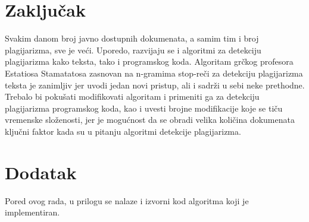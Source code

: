 \documentclass[a4paper]{article}
\begin{document}
\section{Zaključak}
\label{sec:zakljucak}

Svakim danom broj javno dostupnih dokumenata, a samim tim i broj plagijarizma, sve je veći. Uporedo, razvijaju se i algoritmi za detekciju plagijarizma kako teksta, tako i programskog koda. Algoritam grčkog profesora Estatiosa Stamatatosa zasnovan na n-gramima stop-reči za detekciju plagijarizma teksta je zanimljiv jer uvodi jedan novi pristup, ali i sadrži u sebi neke prethodne. Trebalo bi pokušati modifikovati algoritam i primeniti ga za detekciju plagijarizma programskog koda, kao i uvesti brojne modifikacije koje se tiču vremenske složenosti, jer je mogućnost da se obradi velika količina dokumenata ključni faktor kada su u pitanju algoritmi detekcije plagijarizma.

\appendix
 


\appendix
\section{Dodatak}

Pored ovog rada, u prilogu se nalaze i izvorni kod algoritma koji je implementiran.
\end{document}
